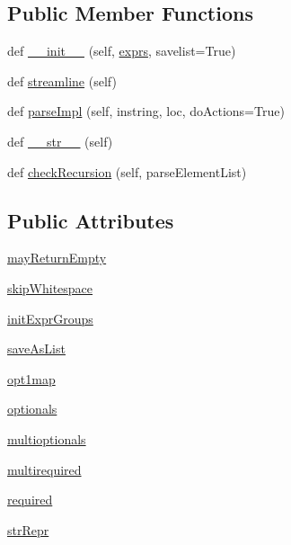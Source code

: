 \subsection*{Public Member Functions}
\begin{DoxyCompactItemize}
\item 
def \hyperlink{classpip_1_1__vendor_1_1pyparsing_1_1Each_a863c57bc688239418e29a6e299b84697}{\+\_\+\+\_\+init\+\_\+\+\_\+} (self, \hyperlink{classpip_1_1__vendor_1_1pyparsing_1_1ParseExpression_a55b67003a1a014d5897ce2478411e75a}{exprs}, savelist=True)
\item 
def \hyperlink{classpip_1_1__vendor_1_1pyparsing_1_1Each_a29b29c0eeae210d9718e4c2d04877bbe}{streamline} (self)
\item 
def \hyperlink{classpip_1_1__vendor_1_1pyparsing_1_1Each_a3c8d004325229a837a197038082df076}{parse\+Impl} (self, instring, loc, do\+Actions=True)
\item 
def \hyperlink{classpip_1_1__vendor_1_1pyparsing_1_1Each_a1f3b7670cac90a0b4c63511063878c3f}{\+\_\+\+\_\+str\+\_\+\+\_\+} (self)
\item 
def \hyperlink{classpip_1_1__vendor_1_1pyparsing_1_1Each_ad88aa755a6b54c69ddf5e01ec8d2836d}{check\+Recursion} (self, parse\+Element\+List)
\end{DoxyCompactItemize}
\subsection*{Public Attributes}
\begin{DoxyCompactItemize}
\item 
\hyperlink{classpip_1_1__vendor_1_1pyparsing_1_1Each_a57e643e8c136a7d5fc228f70f87586a1}{may\+Return\+Empty}
\item 
\hyperlink{classpip_1_1__vendor_1_1pyparsing_1_1Each_ac0e8d1bebab3af05c08bd6bac5d31433}{skip\+Whitespace}
\item 
\hyperlink{classpip_1_1__vendor_1_1pyparsing_1_1Each_a6c0a5f99eb6dc4ce4d5b927c86089b1b}{init\+Expr\+Groups}
\item 
\hyperlink{classpip_1_1__vendor_1_1pyparsing_1_1Each_afcb5edff54c5cca914ce0bf4d6858120}{save\+As\+List}
\item 
\hyperlink{classpip_1_1__vendor_1_1pyparsing_1_1Each_ab8aaed6953e073bd87e8615711037995}{opt1map}
\item 
\hyperlink{classpip_1_1__vendor_1_1pyparsing_1_1Each_a063079aac502fe08e512299d8c3ea589}{optionals}
\item 
\hyperlink{classpip_1_1__vendor_1_1pyparsing_1_1Each_a18dd7c45e1f659f3bdc1f863d1aacc29}{multioptionals}
\item 
\hyperlink{classpip_1_1__vendor_1_1pyparsing_1_1Each_a1656d694b6dcde0488a29d9757bffd11}{multirequired}
\item 
\hyperlink{classpip_1_1__vendor_1_1pyparsing_1_1Each_af5c3be46ffdc2fcf4c6d9b7a0d7d10b7}{required}
\item 
\hyperlink{classpip_1_1__vendor_1_1pyparsing_1_1Each_ad925fa936eea07e847cb03f09c0f4799}{str\+Repr}
\end{DoxyCompactItemize}
